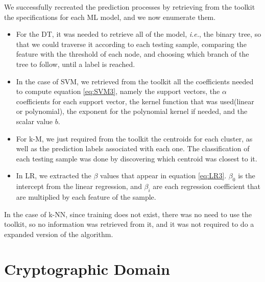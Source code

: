 We successfully recreated the prediction processes by retrieving from the toolkit the specifications for each \ac{ML} model, and we now enumerate them.

\begin{itemize}
	\setlength\itemsep{1em}
    \item For the \ac{DT}, it was needed to retrieve all of the model, \textit{i.e.}, the binary tree, so that we could traverse it according to each testing sample, comparing the feature with the threshold of each node, and choosing which branch of the tree to follow, until a label is reached. 

    \item In the case of \ac{SVM}, we retrieved from the toolkit all the coefficients needed to compute equation \ref{eq:SVM3}, namely the support vectors, the $\alpha$ coefficients for each support vector, the kernel function that was used(linear or polynomial), the exponent for the polynomial kernel if needed, and the scalar value $b$.

    \item For \ac{k-M}, we just required from the toolkit the centroids for each cluster, as well as the prediction labels associated with each one. The classification of each testing sample was done by discovering which centroid was closest to it.

    \item In \ac{LR}, we extracted the $\beta$ values that appear in equation \ref{eq:LR3}. $\beta_0$ is the intercept from the linear regression, and $\beta_i$ are each regression coefficient that are multiplied by each feature of the sample.

\end{itemize}

In the case of \ac{k-NN}, since training does not exist, there was no need to use the toolkit, so no information was retrieved from it, and it was not required to do a expanded version of the algorithm.



\section{Cryptographic Domain}
\label{sec:CryptoDomainImplementation}

